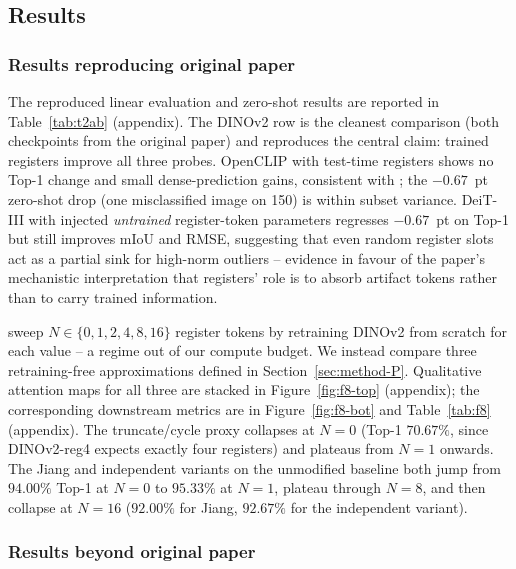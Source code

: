 \subsection{Results}
\label{sec:results-P}

\subsubsection{Results reproducing original paper}

The reproduced linear evaluation and zero-shot results are reported in Table~\ref{tab:t2ab} (appendix). The DINOv2 row is the cleanest comparison (both checkpoints from the original paper) and reproduces the central claim: trained registers improve all three probes. OpenCLIP with test-time registers shows no Top-1 change and small dense-prediction gains, consistent with \citet{jiang2025vision}; the $-0.67$~pt zero-shot drop (one misclassified image on 150) is within subset variance. DeiT-III with injected \emph{untrained} register-token parameters regresses $-0.67$~pt on Top-1 but still improves mIoU and RMSE, suggesting that even random register slots act as a partial sink for high-norm outliers -- evidence in favour of the paper's mechanistic interpretation that registers' role is to absorb artifact tokens rather than to carry trained information.


\citet{darcet2024vision} sweep $N\in\{0,1,2,4,8,16\}$ register tokens by retraining DINOv2 from scratch for each value -- a regime out of our compute budget. We instead compare three retraining-free approximations defined in Section~\ref{sec:method-P}. Qualitative attention maps for all three are stacked in Figure~\ref{fig:f8-top} (appendix); the corresponding downstream metrics are in Figure~\ref{fig:f8-bot} and Table~\ref{tab:f8} (appendix). The truncate/cycle proxy collapses at $N=0$ (Top-1 $70.67\%$, since DINOv2-reg4 expects exactly four registers) and plateaus from $N=1$ onwards. The Jiang and independent variants on the unmodified baseline both jump from $94.00\%$ Top-1 at $N=0$ to $95.33\%$ at $N=1$, plateau through $N=8$, and then collapse at $N=16$ ($92.00\%$ for Jiang, $92.67\%$ for the independent variant). 

\subsubsection{Results beyond original paper}


